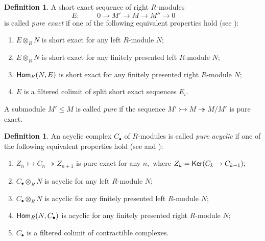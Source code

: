 \documentclass{amsart}
\numberwithin{equation}{section}
\theoremstyle{definition}
\newtheorem{definition}[theorem]{Definition}
\def\epi{\twoheadrightarrow}
\def\mono{\rightarrowtail}
\begin{document}
\begin{definition}
A short exact sequence of right $R$-modules
$$E: \hspace{1cm} 0 \longrightarrow M'\longrightarrow  M \longrightarrow M'' \longrightarrow 0 \hspace{1cm}\  $$
is called {\it pure exact} if one of the following equivalent properties hold (see \cite[Th. 4.89]{lam2012lectures}):
\begin{enumerate}
\item $E\otimes_R N$  is short exact  for any left $R$-module $N$;

\item  $E\otimes_R N$ is short exact  for any finitely presented left $R$-module $N$;



\item ${\sf Hom}_R(N,E)$ is short exact for any finitely presented right $R$-module $N;$

\item $E$ is a filtered colimit of split short exact sequences
$E_i.$
\end{enumerate}
A submodule $M' \leq M$ is called {\it pure} if the sequence $M'\mono M\epi M/M'$ is pure exact. 
\end{definition}


\begin{definition}
An acyclic complex $C_\bullet$ of $R$-modules is called {\it pure acyclic} if one of the following equivalent properties hold (see \cite[Prop.2.2]{emmanouil2016pure} and  \cite[Th.18-2.11]{dauns1994modules}): 
\begin{enumerate}
\item $Z_n\mono C_n \epi Z_{n+1}$ is pure exact for any $n,$ where $Z_k={\sf Ker}(C_k\to C_{k-1});$

\item $C_\bullet\otimes_R N$ is acyclic for  any left $R$-module $N$;

\item $C_\bullet\otimes_R N$ is acyclic for any finitely presented left  $R$-module $N;$
\item ${\sf Hom}_R(N,C_\bullet)$ is acyclic for any finitely presented right $R$-module $N$;
\item $C_\bullet$ is a filtered colimit of contractible complexes. 
\end{enumerate}
\end{definition}
\end{document}
